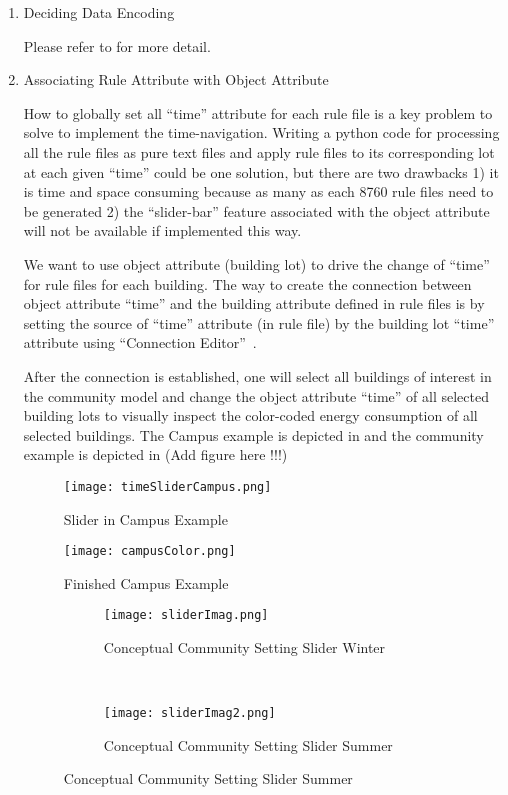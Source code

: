 \begin{enumerate}[1)]
\item{Deciding Data Encoding}

  Please refer to  for more detail.

\item{Associating Rule Attribute with Object Attribute} 

  How to globally set all ``time'' attribute for each rule file is a
  key problem to solve to implement the time-navigation. Writing a
  python code for processing all the rule files as pure text files and
  apply rule files to its corresponding lot at each given ``time''
  could be one solution, but there are two drawbacks 1) it is time and
  space consuming because as many as each 8760 rule files need to be
  generated 2) the ``slider-bar'' feature associated with the object
  attribute will not be available if implemented this way.

  We want to use object attribute (building lot) to drive the change
  of ``time'' for rule files for each building. The way to create the
  connection between object attribute ``time'' and the building
  attribute defined in rule files is by setting the source of ``time''
  attribute (in rule file) by the building lot ``time'' attribute
  using ``Connection Editor''~\cite{cityEngineAttConect2015}.

  After the connection is established, one will select all buildings
  of interest in the community model and change the object attribute
  ``time'' of all selected building lots to visually inspect the
  color-coded energy consumption of all selected buildings. The Campus
  example is depicted in  and the community
  example is depicted in (Add figure here !!!)

  \begin{figure}[h!]
    \centering
    \texttt{[image: timeSliderCampus.png]}
    \caption[Slider in Campus Example]{Slider in Campus Example}
    \label{fig:timeSliderCampus}
  \end{figure}
  \begin{figure}[h!]
    \centering
    \texttt{[image: campusColor.png]}
    \caption[Finished Campus Example]{Finished Campus Example}
    \label{fig:campusColor}
  \end{figure}

  \begin{figure}[h!]
    \centering
    \begin{subfigure}{0.7\textwidth}
      \centering
      \texttt{[image: sliderImag.png]}
      \caption[Conceptual Community Setting Slider Winter]{Conceptual
        Community Setting Slider Winter}
      \label{fig:sliderImag}
    \end{subfigure}
    ~
    \begin{subfigure}{0.7\textwidth}
      \centering
      \texttt{[image: sliderImag2.png]}
      \caption[Conceptual Community Setting Slider Summer]{Conceptual
        Community Setting Slider Summer}
      \label{fig:sliderImag2}
    \end{subfigure}
  \end{figure}


\end{enumerate}
